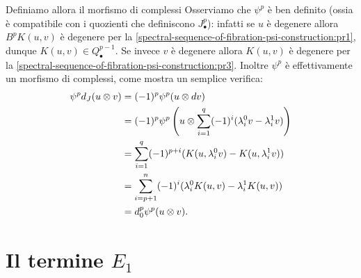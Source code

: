 Definiamo allora il morfismo di complessi
Osserviamo che $\psi^p$ è ben definito (ossia è compatibile con i quozienti che definiscono $J^p_\bullet$): infatti se $u$ è degenere allora $B^pK(u,v)$ è degenere per la \ref{spectral-sequence-of-fibration-psi-construction:pr1}, dunque $K(u,v)\in Q^{p-1}_\bullet$. Se invece $v$ è degenere allora $K(u,v)$ è degenere per la \ref{spectral-sequence-of-fibration-psi-construction:pr3}. Inoltre $\psi^p$ è effettivamente un morfismo di complessi, come mostra un semplice verifica:
\begin{align*}
\psi^pd_J(u\mathbin{\otimes} v)&=(-1)^p\psi^p(u\mathbin{\otimes} dv)\\
&=(-1)^p\psi^p\left(u\mathbin{\otimes}\sum_{i=1}^q(-1)^i(\lambda^0_iv-\lambda^1_iv)\right)\\
&=\sum_{i=1}^q(-1)^{p+i}(K(u,\lambda^0_iv)-K(u,\lambda^1_iv))\\
&=\sum_{i=p+1}^n(-1)^i(\lambda^0_iK(u,v)-\lambda^1_iK(u,v))\\
&=d^p_0\psi^p(u\mathbin{\otimes} v).
\end{align*}

\section{Il termine \texorpdfstring{$E_1$}{E1}}

